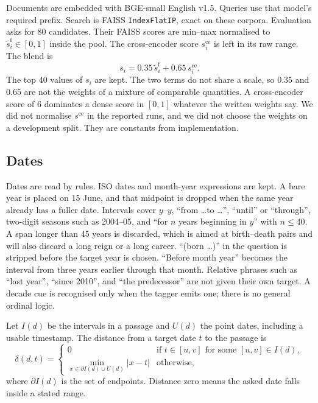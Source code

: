 \documentclass[11pt]{article}
\begin{document}
Documents are embedded with BGE-small English v1.5.
Queries use that model's required prefix.
Search is FAISS \texttt{IndexFlatIP}, exact on these corpora.
Evaluation asks for 80 candidates.
Their FAISS scores are min--max normalised to $\tilde{s}^{\mathrm{f}}_i\in[0,1]$ inside the pool.
The cross-encoder score $s^{\mathrm{ce}}_i$ is left in its raw range.
The blend is
\begin{equation}
s_i = 0.35\,\tilde{s}^{\mathrm{f}}_i + 0.65\,s^{\mathrm{ce}}_i .
\label{eq:blend}
\end{equation}
The top 40 values of $s_i$ are kept.
The two terms do not share a scale, so $0.35$ and $0.65$ are not the weights of a mixture of comparable quantities.
A cross-encoder score of $6$ dominates a dense score in $[0,1]$ whatever the written weights say.
We did not normalise $s^{\mathrm{ce}}$ in the reported runs, and we did not choose the weights on a development split.
They are constants from implementation.

\subsection{Dates}
\label{sec:dates}

Dates are read by rules.
ISO dates and month-year expressions are kept.
A bare year is placed on 15 June, and that midpoint is dropped when the same year already has a fuller date.
Intervals cover $y$--$y$, ``from \ldots to \ldots'', ``until'' or ``through'', two-digit seasons such as 2004--05, and ``for $n$ years beginning in $y$'' with $n\le 40$.
A span longer than 45 years is discarded, which is aimed at birth--death pairs and will also discard a long reign or a long career.
``(born \ldots)'' in the question is stripped before the target year is chosen.
``Before month year'' becomes the interval from three years earlier through that month.
Relative phrases such as ``last year'', ``since 2010'', and ``the predecessor'' are not given their own target.
A decade cue is recognised only when the tagger emits one; there is no general ordinal logic.

Let $I(d)$ be the intervals in a passage and $U(d)$ the point dates, including a usable timestamp.
The distance from a target date $t$ to the passage is
\begin{equation}
\delta(d, t) =
\begin{cases}
0 & \text{if } t \in [u,v] \text{ for some } [u,v]\in I(d),\\[0.25em]
\min\limits_{x \in \partial I(d)\cup U(d)} |x-t| & \text{otherwise,}
\end{cases}
\label{eq:delta}
\end{equation}
where $\partial I(d)$ is the set of endpoints.
Distance zero means the asked date falls inside a stated range.
\end{document}
